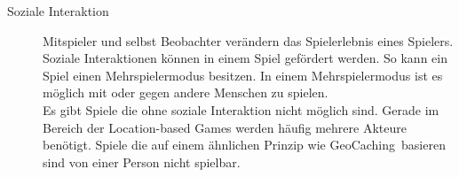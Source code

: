 \begin{description}





\item[Soziale Interaktion]
Mitspieler und selbst Beobachter verändern das Spielerlebnis eines Spielers. Soziale Interaktionen können in einem Spiel gefördert werden. So kann ein Spiel einen Mehrspielermodus besitzen. In einem Mehrspielermodus ist es möglich mit oder gegen andere Menschen zu spielen. \\
Es gibt Spiele die ohne soziale Interaktion nicht möglich sind. Gerade im Bereich der Location-based Games werden häufig mehrere Akteure benötigt. Spiele die auf einem ähnlichen Prinzip wie \glqq GeoCaching\grqq\ basieren sind von einer Person nicht spielbar.









\end{description}

